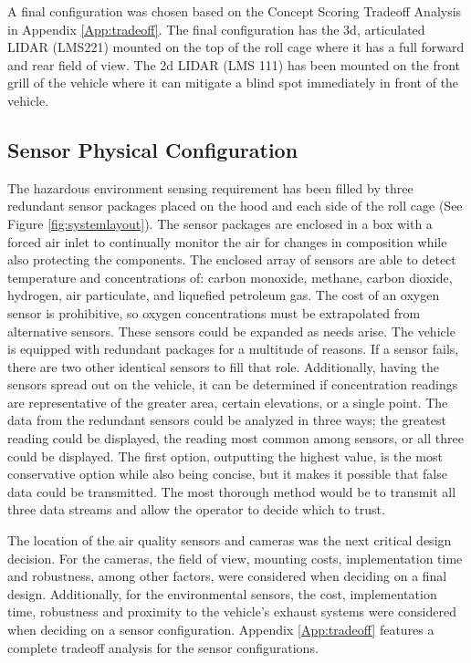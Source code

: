 A final configuration was chosen based on the Concept Scoring Tradeoff Analysis in Appendix \ref{App:tradeoff}. The final configuration has the 3d, articulated LIDAR (LMS221) mounted on the top of the roll cage where it has a full forward and rear field of view. The 2d LIDAR (LMS 111) has been mounted on the front grill of the vehicle where it can mitigate a blind spot immediately in front of the vehicle. 


\subsection{Sensor Physical Configuration}
The hazardous environment sensing requirement has been filled by three redundant sensor packages placed on the hood and each side of the roll cage (See Figure \ref{fig:systemlayout}). The sensor packages  are enclosed in a box with a forced air inlet to continually monitor the air for changes in composition while also protecting the components. The enclosed array of sensors are able to detect temperature and concentrations of: carbon monoxide, methane, carbon dioxide, hydrogen, air particulate, and liquefied petroleum gas. The cost of an oxygen sensor is prohibitive, so oxygen concentrations must be extrapolated from alternative sensors. These sensors could be expanded as needs arise. The vehicle is equipped with redundant packages for a multitude of reasons. If a sensor fails, there are two other identical sensors to fill that role. Additionally, having the sensors spread out on the vehicle, it can be determined if concentration readings are representative of the greater area, certain elevations, or a single point. The data from the redundant sensors could be analyzed in three ways; the greatest reading could be displayed, the reading most common among sensors, or all three could be displayed. The first option, outputting the highest value, is the most conservative option while also being concise, but it makes it possible that false data could be transmitted. The most thorough method would be to transmit all three data streams and allow the operator to decide which to trust. 

The location of the air quality sensors and cameras was the next critical design decision. For the cameras, the field of view, mounting costs, implementation time and robustness, among other factors, were considered when deciding on a final design. Additionally, for the environmental sensors, the cost, implementation time, robustness and proximity to the vehicle's exhaust systems were considered when deciding on a sensor configuration. Appendix \ref{App:tradeoff} features a complete tradeoff analysis for the sensor configurations. 

